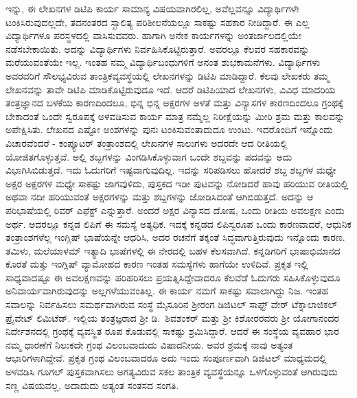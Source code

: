 {ಇನ್ನು, ಈ ಲೇಖನಗಳ ಡಿಟಿಪಿ ಕಾರ್ಯ ಸಾಮಾನ್ಯ ವಿಷಯವಾಗಿರಲಿಲ್ಲ, ಅವೆಲ್ಲ\-ವನ್ನೂ ವಿದ್ಯಾರ್ಥಿಗಳೇ ಟಂಕಿಸಿರುವುದಲ್ಲದೇ, ತದನಂತರದ ಸ್ಖಾಲಿತ್ಯ ಪರಿಶೀಲನೆ\-ಯಲ್ಲೂ ಸಾಕಷ್ಟು ಸಹಕಾರ ನೀಡಿದ್ದಾರೆ. ಈ ಎಲ್ಲ ವಿದ್ಯಾರ್ಥಿಗಳೂ ಪರಸ್ಥಳದಲ್ಲಿ ವಾಸಿಸುವವರು. ಹಾಗಾಗಿ ಅನೇಕ ಕಾರ್ಯಗಳನ್ನು ಅಂತರ್ಜಾಲದಲ್ಲಿಯೇ ನಡೆಸ\-ಬೇಕಾಯಿತು. ಅದನ್ನು ವಿದ್ಯಾರ್ಥಿಗಳು ನಿರ್ವಹಿಸಿಕೊಟ್ಟಿರುತ್ತಾರೆ. ಅವರಲ್ಲೂ ಕೆಲವರ \hbox{ಸಹಕಾರವನ್ನು} ಮರೆಯುವಂತೆಯೇ ಇಲ್ಲ. ಇಂತಹ ನಮ್ಮ \hbox{ವಿದ್ಯಾರ್ಥಿಬಂಧುಗಳಿಗೆ} ಅನಂತ ಶುಭಕಾಮನೆಗಳು. 
ವಿದ್ಯಾರ್ಥಿಗಳು ಅವರವರಿಗೆ ಸೌಲಭ್ಯವಿರುವ ತಾಂತ್ರಿಕ\break ವ್ಯವಸ್ಥೆಯಲ್ಲಿ ಲೇಖನಗಳನ್ನು ಡಿಟಿಪಿ ಮಾಡಿದ್ದಾರೆ. ಕೆಲವು ಲೇಖಕರು ತಮ್ಮ ಲೇಖನ\-ವನ್ನು ತಾವೇ ಡಿಟಿಪಿ ಮಾಡಿಕೊಟ್ಟಿರುವುದೂ ಇದೆ. ಆದರೆ ಡಿಟಿಪಿಯಾದ ಲೇಖನಗಳು, ವಿವಿಧ ಮಾದರಿಯ ತಂತ್ರಜ್ಞಾನದ ಬಳಕೆಯ ಕಾರಣದಿಂದಲೂ, ಭಿನ್ನ ಭಿನ್ನ ಅಕ್ಷರಗಳ ಅಳತೆ ಮತ್ತು ವಿನ್ಯಾಸಗಳ ಕಾರಣದಿಂದಲೂ ಗ್ರಂಥಕ್ಕೆ ಬೇಕಾದಂತೆ ಒಂದೇ ಸ್ವರೂಪಕ್ಕೆ ಅಳವಡಿಸುವ ಕಾರ್ಯ ಮಾತ್ರ ನಮ್ಮೆಲ್ಲ ನಿರೀಕ್ಷೆಯನ್ನು ಮೀರಿ ಶ್ರಮ ಮತ್ತು ಕಾಲವನ್ನು ಅಪೇಕ್ಷಿಸಿತು. ಲೇಖನದ ಎಷ್ಟೋ ಅಂಶಗಳನ್ನು ಪುನಃ \hbox{ಟಂಕಿಸುವಂತಾದುದೂ} ಉಂಟು. ಇದರೊಂದಿಗೆ ಇನ್ನೊಂದು ವಿಚಾರವೆಂದರೆ - ಕಂಪ್ಯೂಟರ್ ತಂತ್ರಾಂಶದಲ್ಲಿ ಲೇಖನಗಳ ಸಾಲುಗಳು ಅದರದೇ ಆದ ರೀತಿಯಲ್ಲಿ ಯೋಜಿತಗೊಳ್ಳುತ್ತವೆ. ಅಲ್ಲಿ ಶಬ್ದಗಳನ್ನು  \hbox{ವಿಂಗಡಿಸಿಕೊಳ್ಳುವಾಗ} ಒಂದೇ ಶಬ್ದವನ್ನು\enginline{-} ಪದವನ್ನು  ಅದು ವಿಭಾಗಿಸಿಬಿಡುತ್ತದೆ. ಇದು ಓದುಗರಿಗೆ ಇಷ್ಟವಾಗುವುದಿಲ್ಲ.  ಇದನ್ನು ಸರಿಪಡಿಸಲು ಹೋದರೆ ಶಬ್ದ ಶಬ್ದಗಳ ಮಧ್ಯೇ ಅಕ್ಷರ ಅಕ್ಷರಗಳ ಮಧ್ಯೇ ಸಾಕಷ್ಟು ಜಾಗವುಳಿದು,  ಪುಸ್ತಕದ ಇಡೀ ಪುಟವನ್ನು ನೋಡಿದರೆ ಹಾವು ಹರಿಯುವ ರೀತಿಯಲ್ಲಿ ಅಥವಾ ನದೀ ಹರಿಯುವಂತೆ  \hbox{ಅಕ್ಷರಗಳನ್ನು} ಮತ್ತು ಶಬ್ದಗಳನ್ನು ಜೋಡಿಸಿದಂತೆ ಆಗಿಬಿಡುತ್ತದೆ. ಅದನ್ನು  ಆ ಪರಿಭಾಷೆಯಲ್ಲಿ \hbox{ರಿವರ್} ಎಫೆಕ್ಟ್ ಎನ್ನುತ್ತಾರೆ. ಅಂದರೆ ಅಕ್ಷರ ವಿನ್ಯಾಸದ ದೋಷ, ಒಂದು ರೀತಿಯ \hbox{ಅವಲಕ್ಷಣ} ಎಂದು ಅರ್ಥ. ಅದರಲ್ಲೂ  ಕನ್ನಡ ಲಿಪಿಗೆ ಈ ಸಮಸ್ಯೆ  ಅತ್ಯಧಿಕ. ಇದಕ್ಕೆ ಕನ್ನಡದ \hbox{ಲಿಪಿಸ್ವರೂಪ} ಒಂದು ಕಾರಣವಾದರೆ, ಆಧುನಿಕ ತಂತ್ರಾಂಶಗಳೆಲ್ಲ ಇಂಗ್ಲಿಷ್ \hbox{ಭಾಷೆಯನ್ನೇ} ಆಧರಿಸಿ, ಅದರ ರಚನೆಗೆ ತಕ್ಕಂತೆ ಸಿದ್ಧವಾಗುತ್ತಿರುವುದು ಇನ್ನೊಂದು ಕಾರಣ. ತಮಿಳು, ಮಲೆಯಾಳಮ್ ಇತ್ಯಾದಿ ಭಾಷೆಗಳಲ್ಲಿ ಈ ನೇರದಲ್ಲಿ ಬಹಳ \hbox{ಕೆಲಸವಾಗಿದೆ.} ಕನ್ನಡಿಗರಿಗೆ ಭಾಷಾಭಿಮಾನದ ಕೊರತೆ ಮತ್ತು ಇಂಗ್ಲಿಷ್ ವ್ಯಾಮೋಹದ ಕಾರಣ ಇಂತಹ ಸಮಸ್ಯೆಗಳು ಹಾಗೆಯೇ ಉಳಿದಿವೆ. ಪ್ರಕೃತ  ಇಲ್ಲಿ \hbox{ಸಾಧ್ಯವಾದಷ್ಟೂ} ಈ ಅವಲಕ್ಷಣವನ್ನು ಪರಿಹರಿಸಲು  ಪ್ರಯತ್ನಿಸಿದ್ದೇವಾದರೂ ಕೆಲವೆಡೆ \hbox{ಓದುಗರು} \hbox{ಸಹಿಸಿಕೊಳ್ಳುವುದೂ} ಅನಿವಾರ್ಯವಾಗಿರುವುದನ್ನು ಅಲ್ಲಗಳೆಯುವಂತಿಲ್ಲ. ಈ ಕಾರ್ಯ ನಮಗೆ ಸಾಕಷ್ಟು  ಸವಾಲಾಗಿದ್ದು ನಿಜ. ಇಂತಹ ಸವಾಲನ್ನು ನಿರ್ವಹಿಸಲು ಸಮರ್ಥವಾಗಿರುವ ಸಂಸ್ಥೆ  ಮೈಸೂರಿನ ಶ್ರೀರಂಗ ಡಿಜಿಟಲ್ ಸಾಫ್ಟ್ ವೇರ್ ಟೆಕ್ನಾಲಾಜಿಕಲ್ \hbox{ಪ್ರೈವೇಟ್} ಲಿಮಿಟೆಡ್. ಇಲ್ಲಿಯ ತಂತ್ರಜ್ಞರಾದ ಶ್ರೀ ಡಿ.\ ಶಿವಶಂಕರ್ ಮತ್ತು ಶ್ರೀ \hbox{ಕಿಶೋರರವರು} ಶ್ರೀ ಯೋಗಾನಂದರ ನಿರ್ದೇಶನದಲ್ಲಿ ಗ್ರಂಥಕ್ಕೆ ವ್ಯವಸ್ಥಿತ\- ರೂಪ \hbox{ಕೊಡುವಲ್ಲಿ} ಸಾಕಷ್ಟು ಶ್ರಮಿಸಿದ್ದಾರೆ. ಆದರೆ ಈ ಸಂಸ್ಥೆಯ ವ್ಯವಹಾರ ಭಾರ ನಮ್ಮ \hbox{ಧಾರಣೆಗೆ} ನಿಲುಕದೇ ಗ್ರಂಥ ವಿಲಂಬವಾದುದು ವಿಷಾದನೀಯ.  ಅವರ ಶ್ರಮಕ್ಕೆ  ನಾವು ಅತ್ಯಂತ \hbox{ಆಭಾರಿಗಳಾಗಿದ್ದೇವೆ.} ಪ್ರಕೃತ ಗ್ರಂಥ  ವಿಲಂಬವಾದರೂ ಅದು ಇಂದು ಸಂಪೂರ್ಣವಾಗಿ ಡಿಜಿಟಲ್ ಮಾಧ್ಯಮದಲ್ಲಿ ಅಳವಡಿಸಿ ಗೂಗಲ್ ಪುಸ್ತಕವಾಗಿಸಲು ಅಗತ್ಯವಿರುವ ಸಕಲ ತಾಂತ್ರಿಕ ವ್ಯವಸ್ಥೆಯನ್ನೂ ಒಳಗೊಳ್ಳುವಂತೆ ಆಗಿರುವುದು  ಸಣ್ಣ ವಿಷಯವಲ್ಲ, ಅದಾದುದು ಅತ್ಯಂತ ಸಂತಸದ ಸಂಗತಿ.

}
